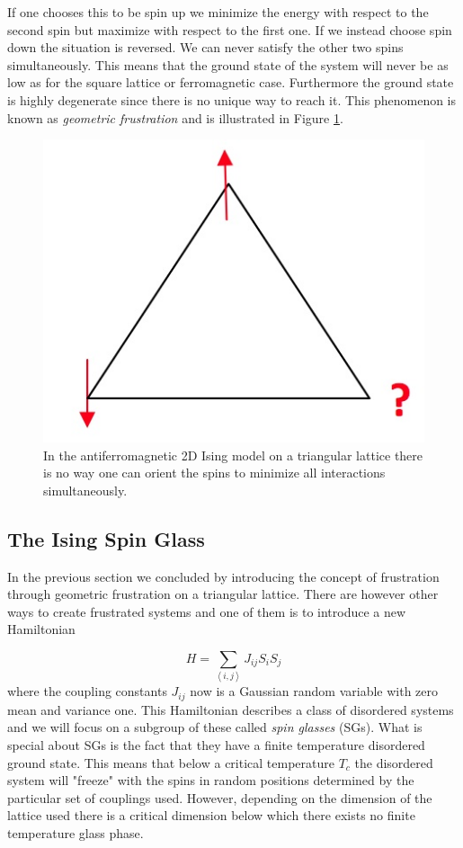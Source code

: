 \documentclass[paper=a4, fontsize=11pt]{scrartcl} %
\numberwithin{equation}{section} %
\numberwithin{figure}{section} %
\numberwithin{table}{section} %
\begin{document}
If one chooses this to be spin up we minimize the energy with respect to the second spin but maximize with respect to the first one. If we instead choose spin down the situation is reversed. We can never satisfy the other two spins simultaneously. This means that the ground state of the system will never be as low as for the square lattice or ferromagnetic case. Furthermore the ground state is highly degenerate since there is no unique way to reach it. This phenomenon is known as \emph{geometric frustration} and is illustrated in Figure \ref{fig:frustration}.

\begin{figure}[hbtp]
\centering
\includegraphics[scale=0.5]{images/frustration.jpg}
\caption{In the antiferromagnetic 2D Ising model on a triangular lattice there is no way one can orient the spins to minimize all interactions simultaneously.}
\label{fig:frustration}
\end{figure}

\subsection{The Ising Spin Glass}
In the previous section we concluded by introducing the concept of frustration through geometric frustration on a triangular lattice. There are however other ways to create frustrated systems and one of them is to introduce a new Hamiltonian

\begin{equation}
H=\sum\limits_{\left\langle i,j \right\rangle} J_{ij} S_{i} S_{j}
\end{equation}
where the coupling constants $J_{ij}$ now is a Gaussian random variable with zero mean and variance one. This Hamiltonian describes a class of disordered systems and we will focus on a subgroup of these called \emph{spin glasses} (SGs). What is special about SGs is the fact that they have a finite temperature disordered ground state. This means that below a critical temperature $T_c$ the disordered system will "freeze" with the spins in random positions determined by the particular set of couplings used. However, depending on the dimension of the lattice used there is a critical dimension below which there exists no finite temperature glass phase\cite{almeida}.
\end{document}
